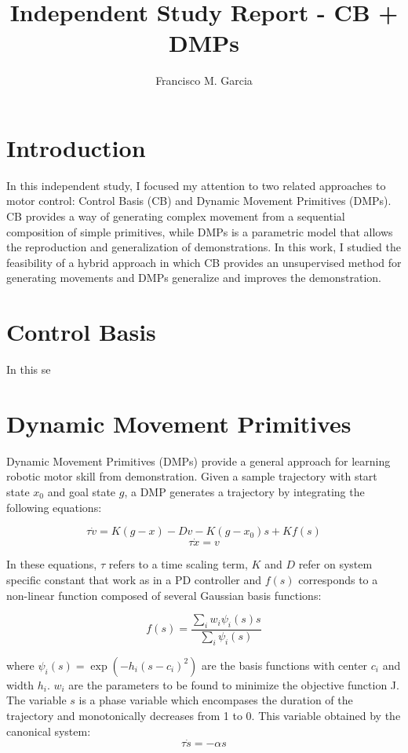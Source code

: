 \documentclass[a4paper]{article}
\begin{document}
\title{Independent Study Report - CB + DMPs}
\author{Francisco M. Garcia}

\maketitle


\section{Introduction}

\indent \indent In this independent study, I focused my attention to two related approaches to motor control: Control Basis (CB) and Dynamic Movement Primitives (DMPs). CB provides a way of generating complex movement from a sequential composition of simple primitives, while DMPs is a parametric model that allows the reproduction and generalization of demonstrations. In this work, I studied the feasibility of a hybrid approach in which CB provides an unsupervised method for generating movements and DMPs generalize and improves the demonstration.

\section{Control Basis}

In this se

\section{Dynamic Movement Primitives}

\indent \indent Dynamic Movement Primitives (DMPs) provide a general approach for learning robotic motor skill from demonstration. Given a sample trajectory with start state $x_0$ and goal state $g$, a DMP generates a trajectory by integrating the following equations:

$$
\tau \dot{v} = K(g - x) - Dv - K(g - x_0) s + Kf(s)
$$
$$
\tau \dot{x} = v
$$

In these equations, $\tau$ refers to a time scaling term, $K$ and $D$ refer on system specific constant that work as in a PD controller and $f(s)$ corresponds to a non-linear function composed of several Gaussian basis functions:

$$
f(s) = \frac{\sum_i w_i \psi_i(s) s }{\sum_i \psi_i(s)}
$$

where $\psi_i(s) = \exp(-h_i(s-c_i)^2)$ are the basis functions with center $c_i$ and width $h_i$. $w_i$ are the parameters to be found to minimize the objective function J. \\
\indent The variable $s$ is a phase variable which encompases the duration of the trajectory and monotonically decreases from 1 to 0. This variable obtained by the canonical system:
$$
\tau \dot{s} = -\alpha s
$$
 
\end{document}
